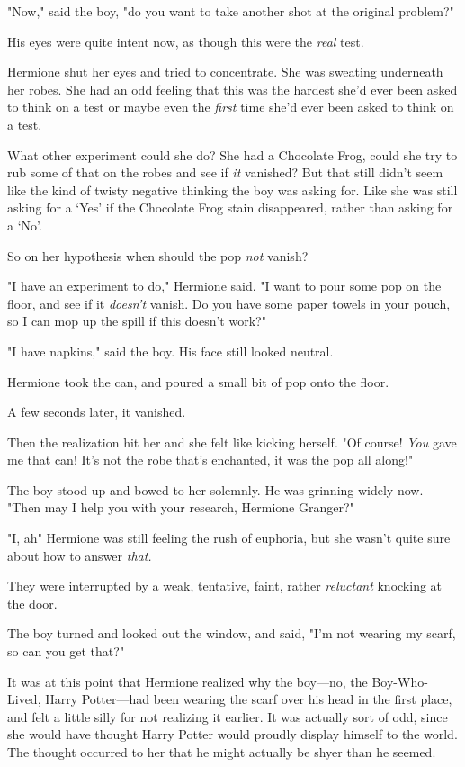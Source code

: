 "Now," said the boy, "do you want to take another shot at the original problem?"

His eyes were quite intent now, as though this were the \emph{real} test.

Hermione shut her eyes and tried to concentrate. She was sweating underneath
her robes. She had an odd feeling that this was the hardest she'd ever been
asked to think on a test or maybe even the \emph{first} time she'd ever been
asked to think on a test.

What other experiment could she do? She had a Chocolate Frog, could she try to
rub some of that on the robes and see if \emph{it} vanished? But that still
didn't seem like the kind of twisty negative thinking the boy was asking for.
Like she was still asking for a `Yes' if the Chocolate Frog stain disappeared,
rather than asking for a `No'.

So{\el} on her hypothesis{\el} when should the pop{\el} \emph{not}
vanish?

"I have an experiment to do," Hermione said. "I want to pour some pop on the
floor, and see if it \emph{doesn't} vanish. Do you have some paper towels in
your pouch, so I can mop up the spill if this doesn't work?"

"I have napkins," said the boy. His face still looked neutral.

Hermione took the can, and poured a small bit of pop onto the floor.

A few seconds later, it vanished.

Then the realization hit her and she felt like kicking herself. "Of course!
\emph{You} gave me that can! It's not the robe that's enchanted, it was the pop
all along!"

The boy stood up and bowed to her solemnly. He was grinning widely now.
"Then{\el} may I help you with your research, Hermione Granger?"

"I, ah{\el}" Hermione was still feeling the rush of euphoria, but she wasn't
quite sure about how to answer \emph{that.}

They were interrupted by a weak, tentative, faint, rather \emph{reluctant}
knocking at the door.

The boy turned and looked out the window, and said, "I'm not wearing my scarf,
so can you get that?"

It was at this point that Hermione realized why the boy---no, the
Boy-Who-Lived, Harry Potter---had been wearing the scarf over his head in the
first place, and felt a little silly for not realizing it earlier. It was
actually sort of odd, since she would have thought Harry Potter would proudly
display himself to the world. The thought occurred to her that he might
actually be shyer than he seemed.

